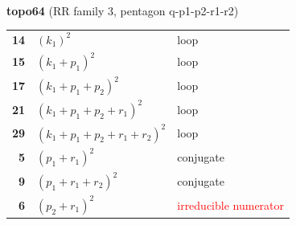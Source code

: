 \documentclass[10pt]{article}
\begin{document}
\begin{minipage}[t]{0.48\textwidth}
{}\\[2mm]\textbf{topo64} (RR family 3, pentagon q-p1-p2-r1-r2)\\[2pt]{\footnotesize\begin{tabular}{@{}r@{\ \ }l@{\ \ }l@{}}\textbf{14} & $(k_1)^2$ & loop\\
\textbf{15} & $(k_1+p_1)^2$ & loop\\
\textbf{17} & $(k_1+p_1+p_2)^2$ & loop\\
\textbf{21} & $(k_1+p_1+p_2+r_1)^2$ & loop\\
\textbf{29} & $(k_1+p_1+p_2+r_1+r_2)^2$ & loop\\
\textbf{5} & $(p_1+r_1)^2$ & conjugate\\
\textbf{9} & $(p_1+r_1+r_2)^2$ & conjugate\\
\textbf{6} & $(p_2+r_1)^2$ & \textcolor{red}{irreducible numerator}\\\end{tabular}}\end{minipage}

\bigskip
\end{document}
